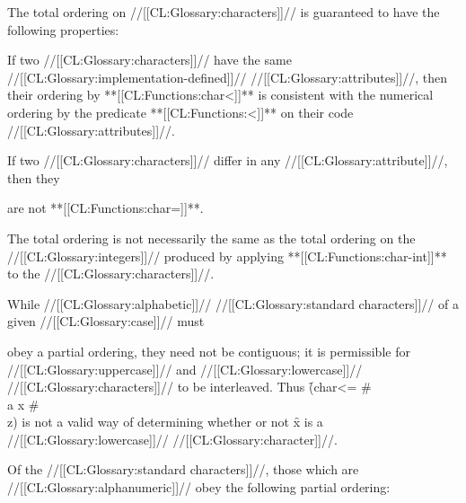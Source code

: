 \endsubSection%


The total ordering on //[[CL:Glossary:characters]]// is guaranteed to have 
the following properties: 

\beginlist



\itemitem{\bull} 
If two //[[CL:Glossary:characters]]// have the same //[[CL:Glossary:implementation-defined]]// //[[CL:Glossary:attributes]]//,
then their ordering by **[[CL:Functions:char<]]** is consistent with the numerical
ordering by the predicate **[[CL:Functions:<]]** on their code //[[CL:Glossary:attributes]]//.


\itemitem{\bull} If two //[[CL:Glossary:characters]]// differ in any //[[CL:Glossary:attribute]]//, then they

are not **[[CL:Functions:char=]]**.




\itemitem{\bull}
  The total ordering is not necessarily the same as the total ordering
  on the //[[CL:Glossary:integers]]// produced by applying **[[CL:Functions:char-int]]** to the
  //[[CL:Glossary:characters]]//.


\itemitem{\bull} 
  While //[[CL:Glossary:alphabetic]]// //[[CL:Glossary:standard characters]]// of a given //[[CL:Glossary:case]]//
  must    

  obey a partial ordering,
  they need not be contiguous; it is permissible for 
  //[[CL:Glossary:uppercase]]// and //[[CL:Glossary:lowercase]]// //[[CL:Glossary:characters]]// to be interleaved. 
  Thus \f{(char<= \#\\a x \#\\z)} 
  is not a valid way of determining whether or not \f{x} is a
  //[[CL:Glossary:lowercase]]// //[[CL:Glossary:character]]//.  





\endlist




Of the //[[CL:Glossary:standard characters]]//, 
those which are //[[CL:Glossary:alphanumeric]]// obey the following partial ordering:


